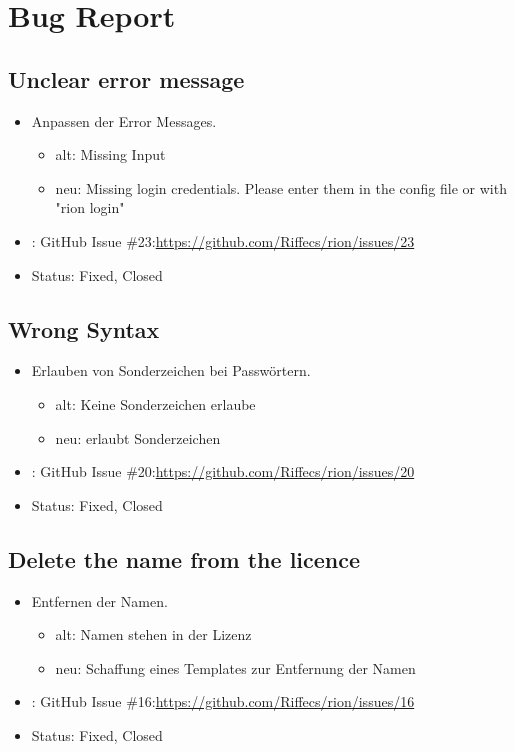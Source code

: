 \chapter{Bug Report}
\section{Unclear error message}
\begin{itemize}
    \item Anpassen der Error Messages.
    \begin{itemize}
        \item alt: Missing Input
        \item neu: Missing login credentials. Please enter them in the config file or with "rion login" 
    \end{itemize}
    \item: GitHub Issue \#23:\url{https://github.com/Riffecs/rion/issues/23}
    \item Status: Fixed, Closed
\end{itemize}

\section{Wrong Syntax}
\begin{itemize}
    \item Erlauben von Sonderzeichen bei Passwörtern.
    \begin{itemize}
        \item alt: Keine Sonderzeichen erlaube
        \item neu: erlaubt Sonderzeichen
    \end{itemize}
    \item: GitHub Issue \#20:\url{https://github.com/Riffecs/rion/issues/20}
    \item Status: Fixed, Closed
\end{itemize}

\section{Delete the name from the licence}
\begin{itemize}
    \item Entfernen der Namen.
    \begin{itemize}
        \item alt: Namen stehen in der Lizenz
        \item neu: Schaffung eines Templates zur Entfernung der Namen
    \end{itemize}
    \item: GitHub Issue \#16:\url{https://github.com/Riffecs/rion/issues/16}
    \item Status: Fixed, Closed
\end{itemize}

